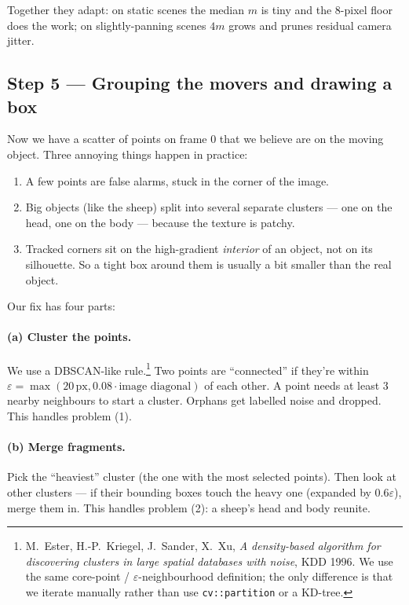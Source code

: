 \documentclass[11pt,a4paper]{article}
\begin{document}
Together they adapt: on static scenes the median $m$ is tiny and the
8-pixel floor does the work; on slightly-panning scenes $4m$ grows
and prunes residual camera jitter.

\subsection{Step 5 --- Grouping the movers and drawing a box}

Now we have a scatter of points on frame 0 that we believe are on
the moving object. Three annoying things happen in practice:

\begin{enumerate}\itemsep2pt
\item A few points are false alarms, stuck in the corner of the
  image.
\item Big objects (like the sheep) split into several separate
  clusters --- one on the head, one on the body --- because the
  texture is patchy.
\item Tracked corners sit on the high-gradient \emph{interior} of an
  object, not on its silhouette. So a tight box around them is
  usually a bit smaller than the real object.
\end{enumerate}

Our fix has four parts:

\paragraph{(a) Cluster the points.} We use a DBSCAN-like
rule.\footnote{M.~Ester, H.-P.~Kriegel, J.~Sander, X.~Xu,
\emph{A density-based algorithm for discovering clusters in large
spatial databases with noise}, KDD 1996. We use the same
core-point / $\varepsilon$-neighbourhood definition; the only
difference is that we iterate manually rather than use
\texttt{cv::partition} or a KD-tree.}
Two points are ``connected'' if they're within
$\varepsilon = \max(20\,\text{px}, 0.08 \cdot \text{image diagonal})$
of each other. A point needs at least 3 nearby neighbours to start
a cluster. Orphans get labelled noise and dropped. This handles
problem (1).

\paragraph{(b) Merge fragments.} Pick the ``heaviest'' cluster (the
one with the most selected points). Then look at other clusters ---
if their bounding boxes touch the heavy one (expanded by
$0.6\varepsilon$), merge them in. This handles problem (2): a
sheep's head and body reunite.
\end{document}
